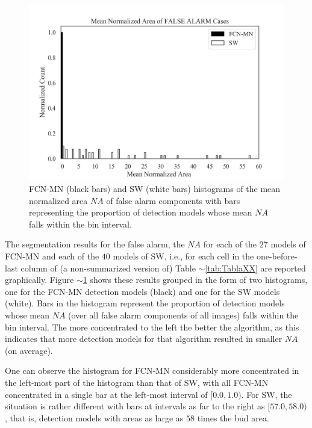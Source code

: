 \documentclass[a4paper,authoryear,review]{elsarticle}
\begin{document}
\begin{figure}%
    \centering
      \includegraphics[width=\textwidth]{figures/AAA_mean_relative_area_fcn_vs_sw.png}%
\caption{
FCN-MN (black bars) and SW (white bars) histograms of the mean normalized area $NA$ of false alarm components with bars representing the proportion of detection models whose mean $NA$ falls within the bin interval.
    }
\label{fig:AAA}
\end{figure}


The segmentation results for the false alarm, the $NA$  for each of the $27$ models of FCN-MN and each of the $40$ models of SW, i.e., for each cell in the  one-before-last column of (a non-summarized version of) Table $\sim$\ref{tab:TablaXX} are reported graphically. Figure $\sim$\ref{fig:AAA} shows these results grouped in the form of two histograms, one for the FCN-MN detection models (black) and one for the SW models  (white). Bars in the histogram represent the proportion of detection models whose mean $NA$ (over all false alarm components of all images) falls within the bin interval. The more concentrated to the left the better the algorithm, as this indicates that more detection models for that algorithm resulted in smaller $NA$ (on average).

One can observe the histogram for FCN-MN considerably more concentrated in the left-most part of the histogram than that of SW, with all FCN-MN concentrated in a single bar at the left-most interval of $[0.0, 1.0)$. For SW, the situation is rather different with bars at intervals as far to the right as $[57.0, 58.0)$, that is, detection models with areas as large as $58$ times the bud area. 
\end{document}

